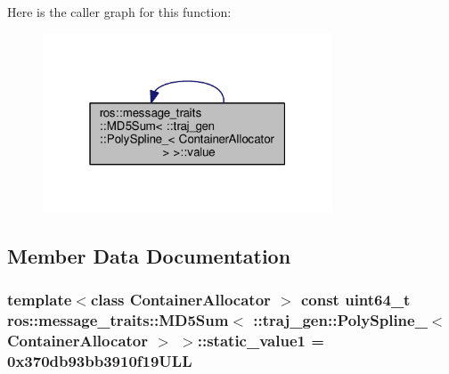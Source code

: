 Here is the caller graph for this function\+:
\nopagebreak
\begin{figure}[H]
\begin{center}
\leavevmode
\includegraphics[width=244pt]{structros_1_1message__traits_1_1_m_d5_sum_3_01_1_1traj__gen_1_1_poly_spline___3_01_container_allocator_01_4_01_4_ad5fb23c8ee28b87aa118f1f071fdc3b5_icgraph}
\end{center}
\end{figure}




\subsection{Member Data Documentation}
\subsubsection[{\texorpdfstring{static\+\_\+value1}{static_value1}}]{\setlength{\rightskip}{0pt plus 5cm}template$<$class Container\+Allocator $>$ const uint64\+\_\+t ros\+::message\+\_\+traits\+::\+M\+D5\+Sum$<$ \+::{\bf traj\+\_\+gen\+::\+Poly\+Spline\+\_\+}$<$ Container\+Allocator $>$ $>$\+::static\+\_\+value1 = 0x370db93bb3910f19\+U\+LL\hspace{0.3cm}{\ttfamily [static]}}\hypertarget{structros_1_1message__traits_1_1_m_d5_sum_3_01_1_1traj__gen_1_1_poly_spline___3_01_container_allocator_01_4_01_4_a9b04376c25deef7728e828846226eb45}{}\label{structros_1_1message__traits_1_1_m_d5_sum_3_01_1_1traj__gen_1_1_poly_spline___3_01_container_allocator_01_4_01_4_a9b04376c25deef7728e828846226eb45}


